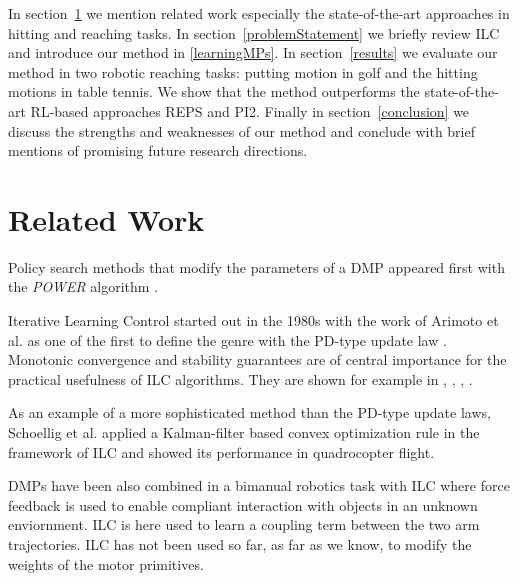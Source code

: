 \documentclass[10pt,a4paper]{article}
\begin{document}
In section~\ref{relatedWork} we mention related work especially the state-of-the-art approaches in hitting and reaching tasks. In section~\ref{problemStatement} we briefly review ILC and introduce our method in \ref{learningMPs}. In section~\ref{results} we evaluate our method in two robotic reaching tasks: putting motion in golf and the hitting motions in table tennis. We show that the method outperforms the state-of-the-art RL-based approaches REPS and PI2. Finally in section~\ref{conclusion} we discuss the strengths and weaknesses of our method and conclude with brief mentions of promising future research directions.


\section{Related Work}\label{relatedWork}

Policy search methods that modify the parameters of a DMP appeared first with the \emph{POWER} algorithm \cite{Kober08}.

Iterative Learning Control started out in the 1980s with the work of Arimoto et al. \cite{Arimoto84} as one of the first to define the genre with the PD-type update law \cite{Bristow06}. Monotonic convergence and stability guarantees are of central importance for the practical usefulness of ILC algorithms. They are shown for example in \cite{Bristow06}, \cite{Norrloef02}, \cite{Lee97}, \cite{Longman2000}.

As an example of a more sophisticated method than the PD-type update laws, Schoellig et al. \cite{Schoellig12} applied a Kalman-filter based convex optimization rule in the framework of ILC and showed its performance in quadrocopter flight. 

DMPs have been also combined in a bimanual robotics task with ILC \cite{Gams13} where force feedback is used to enable compliant interaction with objects in an unknown enviornment. ILC is here used to learn a coupling term between the two arm trajectories. ILC has not been used so far, as far as we know, to modify the weights of the motor primitives.
\end{document}
